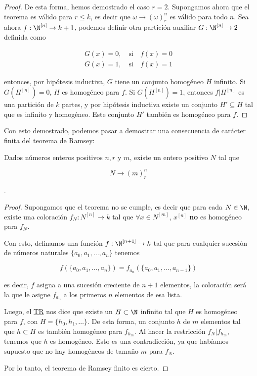 \begin{proof}
    De esta forma, hemos demostrado el caso $r=2$. Supongamos ahora que el teorema es válido para $r \leq k$, es decir que $\omega \rightarrow (\omega)_r^n$ es válido para todo $n$. Sea ahora $f: \N^{[n]} \rightarrow k+1$, podemos definir otra partición auxiliar $G: \N^{[n]} \rightarrow 2$ definida como
    
    \begin{gather*}
        G(x) = 0, \quad \text{si} \quad f(x) = 0 \\
        G(x) = 1, \quad \text{si} \quad f(x) = 1
    \end{gather*}
    
    \noindent entonces, por hipótesis inductiva, $G$ tiene un conjunto homogéneo $H$ infinito. Si $G\left( H^{[n]} \right) = 0$, $H$ es homogéneo para $f$. Si $G\left( H^{[n]} \right) = 1$, entonces $f|H^{[n]}$ es una partición de $k$ partes, y por hipótesis inductiva existe un conjunto $H' \subseteq H$ tal que es infinito y homogéneo. Este conjunto $H'$ también es homogéneo para $f$.
\end{proof}

Con esto demostrado, podemos pasar a demostrar una consecuencia de carácter finita del teorema de Ramsey:

\begin{teo}\label{teo:TRF}
    Dados números enteros positivos $n, r$ y $m$, existe un entero positivo $N$ tal que
    
    \[
    N \rightarrow (m)_r^n
    \]
\end{teo}

.

\begin{proof}
    Supongamos que el teorema no se cumple, es decir que para cada $N \in \N$, existe una coloración $f_N: N^{[n]} \rightarrow k$ tal que $\forall x \in N^{[m]}$, $x^{[n]}$ \textbf{no} es homogéneo para $f_N$.
    
    Con esto, definamos una función $f: \N^{[n+1]} \rightarrow k$ tal que para cualquier sucesión de números naturales $\{a_0, a_1, \dots, a_n\}$ tenemos
    
    \[
    f\left( \{a_0, a_1, \dots, a_n\} \right) = f_{a_n} \left( \{a_0, a_1, \dots, a_{n-1}\} \right)
    \]
    
    \noindent es decir, $f$ asigna a una sucesión creciente de $n+1$ elementos, la coloración será la que le asigne $f_{a_n}$ a los primeros $n$ elementos de esa lista.
    
    Luego, el \hyperref[teo:TR]{TR} nos dice que existe un $H \subset \N$ infinito tal que $H$ es homogéneo para $f$, con $H = \{h_0, h_1, \dots \}$. De esta forma, un conjunto $h$ de $m$ elementos tal que $h \subset H$ es también homogéneo para $f_{h_m}$. Al hacer la restricción $f_N|f_{h_m}$, tenemos que $h$ es homogéneo. Esto es una contradicción, ya que habíamos supuesto que no hay homogéneos de tamaño $m$ para $f_N$.
    
    Por lo tanto, el teorema de Ramsey finito es cierto.
\end{proof}
